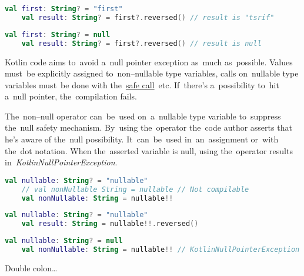 \begin{lstlisting}[language=Kotlin]
    val first: String? = "first"
    val result: String? = first?.reversed() // result is "tsrif"
\end{lstlisting}

\begin{lstlisting}[language=Kotlin]
    val first: String? = null
    val result: String? = first?.reversed() // result is null
\end{lstlisting}
\newpage

Kotlin code aims to~avoid a~null pointer exception as~much as~possible.
Values must~be explicitly assigned to~non--nullable type variables, calls on~nullable type variables must~be done with the~\hyperref[kotlinsafecall]{safe call}~etc.
If~there's a~possibility to~hit a~null pointer, the~compilation fails.

\mbox{The~non--null} operator can~be~used on~a~nullable type variable to~suppress the~null safety mechanism.
By~using the~operator the~code author asserts that he's aware of the~null possibility.
It~can~be~used in~an~assignment or~with the~dot notation.
When the~asserted variable is null, using the~operator results \mbox{in \textit{KotlinNullPointerException}.}

\begin{lstlisting}[language=Kotlin]
    val nullable: String? = "nullable"
    // val nonNullable String = nullable // Not compilable
    val nonNullable: String = nullable!!
\end{lstlisting}

\begin{lstlisting}[language=Kotlin]
    val nullable: String? = "nullable"
    val result: String = nullable!!.reversed()
\end{lstlisting}

\begin{lstlisting}[language=Kotlin]
    val nullable: String? = null
    val nonNullable: String = nullable!! // KotlinNullPointerException
\end{lstlisting}

\label{kotlinoperatoroverload}

\label{kotlincallablereference}
Double colon\dots

